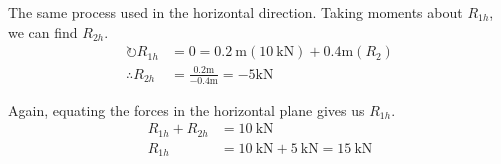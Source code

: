 The same process used in the horizontal direction. Taking moments about $R_{1h}$, we can find $R_{2h}$.
\begin{align}
  \circlearrowright R_{1h} &= 0 = \SI{0.2}{\metre}(\SI{10}{\kilo\newton}) + 0.4\si{\metre}(R_2) \\
  \therefore R_{2h} &=  \frac{0.2\si{\metre}}{-0.4\si{\metre}} = -5\si{\kilo\newton}
\end{align}

Again, equating the forces in the horizontal plane gives us $R_{1h}$.
\begin{align}
  R_{1h}+R_{2h}&=\SI{10}{\kilo\newton} \\
  R_{1h} &= \SI{10}{\kilo\newton} + \SI{5}{\kilo\newton} = \SI{15}{\kilo\newton}
\end{align}

